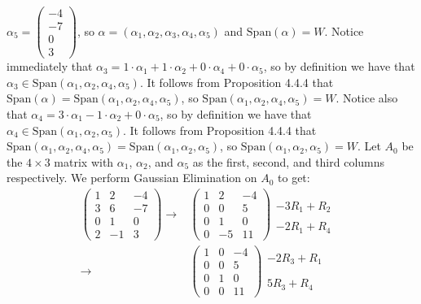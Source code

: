 \documentclass[12pt]{article}
\newenvironment{problem}[2][Problem]
{
	\begin{trivlist} 
		\item[\hskip \labelsep {\bfseries #1 #2:}]
	}
{
	\end{trivlist}
	}
\newenvironment{solution}[1][Solution]
{
	\begin{trivlist} 
		\item[\hskip \labelsep {\itshape #1:}]
	}
	{
	\end{trivlist}
}
\begin{document}
\begin{problem}{3}
\begin{solution}
$\alpha_5 = \begin{pmatrix} -4\\-7\\0\\3 \end{pmatrix}$,
so $\alpha = (\alpha_1, \alpha_2,\alpha_3,\alpha_4,\alpha_5)$ and $\text{Span}(\alpha)=W$. Notice immediately that $\alpha_3 = 1\cdot\alpha_1 + 1\cdot\alpha_2 + 0\cdot\alpha_4 + 0\cdot\alpha_5$, so by definition we have that  $\alpha_3 \in \text{Span}(\alpha_1,\alpha_2,\alpha_4,\alpha_5)$. It follows from Proposition 4.4.4 that $\text{Span}(\alpha) = \text{Span}(\alpha_1,\alpha_2,\alpha_4,\alpha_5)$, so $\text{Span}(\alpha_1,\alpha_2,\alpha_4,\alpha_5)=W$. Notice also that $\alpha_4 = 3\cdot\alpha_1 - 1\cdot\alpha_2 + 0\cdot\alpha_5$, so by definition we have that $\alpha_4 \in \text{Span}(\alpha_1,\alpha_2,\alpha_5)$. It follows from Proposition 4.4.4 that $\text{Span}(\alpha_1,\alpha_2,\alpha_4,\alpha_5)=\text{Span}(\alpha_1,\alpha_2,\alpha_5)$, so $\text{Span}(\alpha_1,\alpha_2,\alpha_5) = W$. Let $A_0$ be the $4\times 3$ matrix with $\alpha_1$, $\alpha_2$, and $\alpha_5$ as the first, second, and third columns respectively. We perform Gaussian Elimination on $A_0$ to get:
\begin{align*}
\begin{pmatrix} 1&2&-4\\3&6&-7\\0&1&0\\2&-1&3 \end{pmatrix} \rightarrow& \begin{pmatrix} 1&2&-4\\0&0&5\\0&1&0\\0&-5&11 \end{pmatrix} \begin{matrix} \text{ } \\ -3R_1 + R_2 \text{ } \\ \text{ } \\ -2R_1 + R_4 \text{ } \end{matrix}\\
%
\rightarrow& \begin{pmatrix} 1&0&-4\\0&0&5\\0&1&0\\0&0&11 \end{pmatrix} \begin{matrix} -2R_3+R_1\text{ } \\  \text{ } \\ \text{ } \\ 5R_3 + R_4 \text{ } \end{matrix}\\

\end{align*}
\end{solution}
\end{problem}
\end{document}
